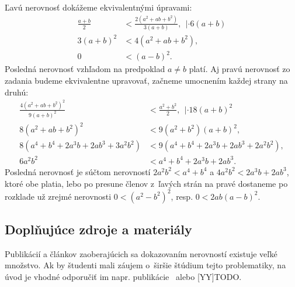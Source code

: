 \rieh Ľavú nerovnosť dokážeme ekvivalentnými úpravami:
\begin{align*}
\frac{a+b}{2}&<\frac{2(a^2 + ab + b^2 )}{3(a+b)}, \ \ | \cdot 6(a+b)\\
3(a+b)^2&<4(a^2+ab+b^2),\\
0&<(a-b)^2.
\end{align*}
Posledná nerovnosť vzhľadom na predpoklad $a\neq b$ platí. Aj pravú nerovnosť zo zadania budeme ekvivalentne upravovať, začneme umocnením každej strany na druhú:
\begin{align*}
\frac{4(a^2 + ab + b^2 )^2}{9(a + b)^2}&<\frac{a^2 + b^2}{2}, \ \ | \cdot 18(a + b)^2\\
8(a^2 + ab + b^2 )^2 &< 9(a^2 + b^2 )(a + b)^2,\\
8(a^4 + b^4 + 2a^3 b + 2ab^3 + 3a^2 b^2 ) &< 9(a^4 + b^4 + 2a^3 b + 2ab^3 + 2a^2 b^2 ),\\
6a^2 b^2 &< a^4 + b^4 + 2a^3 b + 2ab^3.
\end{align*}
Posledná nerovnosť je súčtom nerovností $2a^2 b^2 < a^4 + b^4$ a $4a^2 b^2 < 2a^3 b + 2ab^3$, ktoré obe platia, lebo po presune členov z~ľavých strán na pravé dostaneme po rozklade už zrejmé nerovnosti $0 < (a^2- b^2)^2$, resp. $0 < 2ab(a - b)^2$.

\subsection*{Doplňujúce zdroje a materiály}
Publikácií a článkov zaoberajúcich sa dokazovaním nerovností existuje veľké množstvo. Ak by študenti mali záujem o~širšie štúdium tejto problematiky, na úvod je vhodné odporučiť im napr. publikácie~\cite{bocek1994} alebo [YY]TODO.
